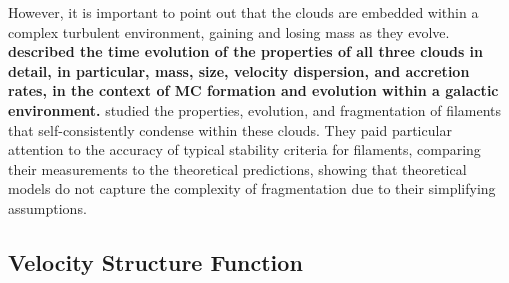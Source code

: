 However, it is important to point out that the clouds are embedded within a complex turbulent environment, gaining and losing mass as they evolve.
\textbf{ described the time evolution of the properties of all three clouds in detail, in particular, mass, size, velocity dispersion, and accretion rates, in the context of MC formation and evolution within a galactic environment.}
 studied the properties, evolution, and fragmentation of filaments that self-consistently condense within these clouds. 
They paid particular attention to the accuracy of typical stability criteria for filaments, comparing their measurements to the theoretical predictions, showing that theoretical models do not capture the complexity of fragmentation due to their simplifying assumptions.


\subsection{Velocity Structure Function}\label{methods:vsf}

